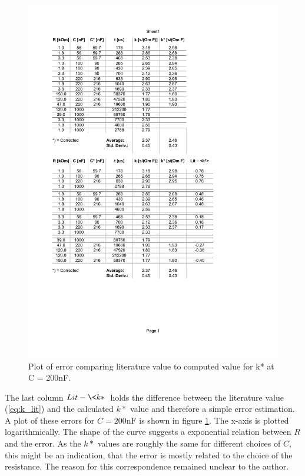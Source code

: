 \documentclass[journal]{IEEEtran}
\begin{document}
\begin{figure}
  \centering
   \includegraphics[trim=50mm 90mm 45mm 125mm, clip,
   width=\columnwidth,page=2]{results/am_data.pdf}
   \caption{Plot of error comparing literature value to computed value for k* at
   C = 200nF.}
   \label{fig:am_plot}
\end{figure}

The last column $Lit - \<k*\>$ holds the difference between the literature value
(\ref{eq:k_lit}) and the calculated $k*$ value and therefore a simple error
estimation. A plot of these errors for $C = 200\text{nF}$ is shown in figure
\ref{fig:am_plot}. The x-axis is plotted logarithmically. The shape of the curve
suggests a exponential relation between $R$ and the error. As the $k*$ values
are roughly the same for different choices of $C$, this might be an indication,
that the error is mostly related to the choice of the resistance. The reason for
this correspondence remained unclear to the author.
\end{document}
